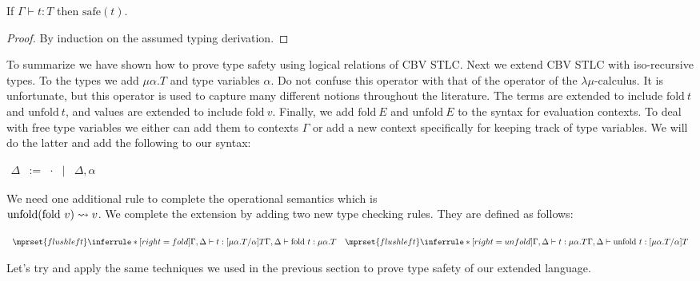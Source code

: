 \begin{thm}
  \label{corollary:type_safety}
  If $\Gamma \vdash t : T$ then $\text{safe}(t)$.
\end{thm}
\begin{proof}
  By induction on the assumed typing derivation.
\end{proof}
To summarize we have shown how to prove type safety using logical
relations of CBV STLC.  Next we extend CBV STLC with iso-recursive
types.  To the types we add $\mu \alpha . T$ and type variables
$\alpha$.  Do not confuse this operator with that of the operator of
the $\lambda\mu$-calculus.  It is unfortunate, but this operator is used to
capture many different notions throughout the literature.  The terms
are extended to include $\text{fold}\ t$ and $\text{unfold}\ t$, and
values are extended to include $\text{fold}\ v$.  Finally, we add
$\text{fold}\ E$ and $\text{unfold}\ E$ to the syntax for evaluation
contexts.  To deal with free type variables we either can add them to
contexts $\Gamma$ or add a new context specifically for keeping track
of type variables.  We will do the latter and add the following to our
syntax:
\begin{center}
  \begin{math}
    \begin{array}{lllll}
      \Delta & := & \cdot & | & \Delta,\alpha
    \end{array}
  \end{math}
\end{center}
We need one additional rule to complete the operational semantics which is \\
$\text{unfold}(\text{fold}\ v) \rightsquigarrow v$.  We complete the extension by adding
two new type checking rules.  They are defined as follows: 
\begin{center}
  \begin{math}
    \begin{array}{lll}
      $$\mprset{flushleft}
      \inferrule* [right=fold] {
        \Gamma,\Delta \vdash t : [\mu \alpha.T/\alpha]T
      }{\Gamma,\Delta \vdash \text{fold}\ t:\mu \alpha.T}
      &
      $$\mprset{flushleft}
      \inferrule* [right=unfold] {
        \Gamma,\Delta \vdash t : \mu \alpha.T
      }{\Gamma,\Delta \vdash \text{unfold}\ t:[\mu \alpha.T/\alpha]T}
    \end{array}
  \end{math}
\end{center}
Let's try and apply the same techniques we used in the previous section to prove
type safety of our extended language.

